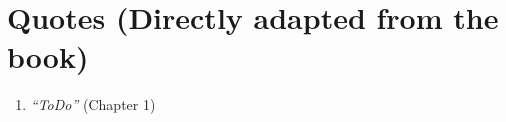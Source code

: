 \section*{Quotes (Directly adapted from the book)}
\begin{enumerate}
    \item \emph{``ToDo''} (Chapter 1)
\end{enumerate}